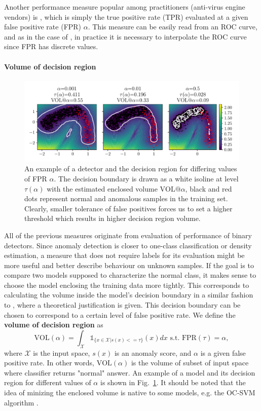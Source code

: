 Another performance measure popular among practitioners (anti-virus engine vendors) is \textbf{\tpra}, which is simply the true positive rate (TPR) evaluated at a given false positive rate (FPR) $\alpha.$ This measure can be easily read from an ROC curve, and as in the case of \auca, in practice it is necessary to interpolate the ROC curve since FPR has discrete values.

\paragraph{Volume of decision region}
\begin{figure}
\centering
\includegraphics[scale=0.8]{data/chapter_intro/fig_vol_example.pdf}
\caption{An example of a detector and the decision region for differing values of FPR $\alpha$. The decision boundary is drawn as a white isoline at level $\tau(\alpha)$ with the estimated enclosed volume $\text{VOL@}\alpha$, black and red dots represent normal and anomalous samples in the training set. Clearly, smaller tolerance of false positives forces us to set a higher threshold which results in higher decision region volume.}
\label{fig:vol_example}
\end{figure}
All of the previous measures originate from evaluation of performance of binary detectors. Since anomaly detection is closer to one-class classification or density estimation, a measure that does not require labels for its evaluation might be more useful and better describe behaviour on unknown samples. If the goal is to compare two models supposed to characterize the normal class, it makes sense to choose the model enclosing the training data more tightly. This corresponds to calculating  the volume inside the model's decision boundary in a similar fashion to \cite{clemenccon2013scoring}, where a theoretical justification is given. This decision boundary can be chosen to correspond to a certain level of false positive rate. We define the \textbf{volume of decision region} as
\begin{equation}
  \text{VOL}(\alpha) = \int_{\mathcal{X}} \mathds{1}_{\lbrace x\in\mathcal{X}|s(x) <= \tau\rbrace} \left( x \right) dx  \text{ s.t. } \text{FPR}(\tau)=\alpha,
\end{equation}
where $\mathcal{X}$ is the input space, $s(x)$ is an anomaly score, and $\alpha$ is a given false positive rate. In other words, $\text{VOL}(\alpha)$ is the volume of subset of input space where classifier returns "normal" answer. An example of a model and its decision region for different values of $\alpha$ is shown in Fig.~\ref{fig:vol_example}. It should be noted that the idea of minizing the enclosed volume is native to some models, e.g. the OC-SVM algorithm \cite{scholkopf2001estimating}.

